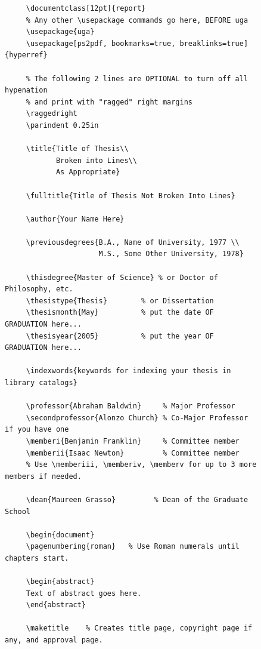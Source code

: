 \documentclass[12pt]{report}
\begin{document}
\begin{figure}
\begin{center}
\begin{minipage}{5in}
\tiny
\begin{verbatim}
     \documentclass[12pt]{report}
     % Any other \usepackage commands go here, BEFORE uga
     \usepackage{uga}
     \usepackage[ps2pdf, bookmarks=true, breaklinks=true]{hyperref}

     % The following 2 lines are OPTIONAL to turn off all hypenation
     % and print with "ragged" right margins
     \raggedright
     \parindent 0.25in

     \title{Title of Thesis\\
            Broken into Lines\\
            As Appropriate}

     \fulltitle{Title of Thesis Not Broken Into Lines}

     \author{Your Name Here}

     \previousdegrees{B.A., Name of University, 1977 \\
                      M.S., Some Other University, 1978}

     \thisdegree{Master of Science} % or Doctor of Philosophy, etc.
     \thesistype{Thesis}        % or Dissertation
     \thesismonth{May}          % put the date OF GRADUATION here...
     \thesisyear{2005}          % put the year OF GRADUATION here...

     \indexwords{keywords for indexing your thesis in library catalogs}

     \professor{Abraham Baldwin}     % Major Professor
     \secondprofessor{Alonzo Church} % Co-Major Professor if you have one
     \memberi{Benjamin Franklin}     % Committee member
     \memberii{Isaac Newton}         % Committee member
     % Use \memberiii, \memberiv, \memberv for up to 3 more members if needed.

     \dean{Maureen Grasso}         % Dean of the Graduate School

     \begin{document}
     \pagenumbering{roman}   % Use Roman numerals until chapters start.

     \begin{abstract}
     Text of abstract goes here.
     \end{abstract}

     \maketitle    % Creates title page, copyright page if any, and approval page.


\end{verbatim}
\end{minipage}
\end{center}
\end{figure}
\end{document}
